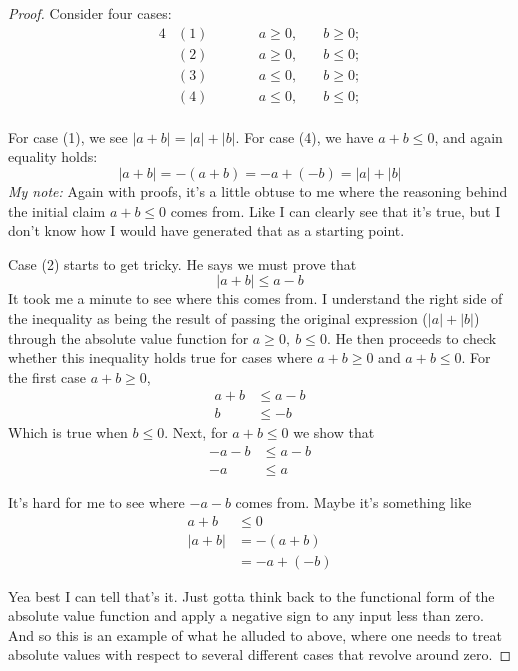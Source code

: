 \begin{proof}
    Consider four cases:
    \begin{alignat*}{4}
        &(1)\quad\quad&& a \geq 0, \quad & b \geq 0;\\
        &(2)\quad\quad && a \geq 0, \quad & b \leq 0;\\
        &(3)\quad\quad && a \leq 0, \quad & b \geq 0;\\
        &(4)\quad\quad && a \leq 0, \quad & b \leq 0;\\
    \end{alignat*} 

    For case (1), we see $\lvert a + b \rvert = \lvert a \rvert + \lvert b \rvert$.
    For case (4), we have $a+b \leq 0$, and again equality holds:
    \[
    \lvert a + b \rvert = -(a+b) = -a + (-b) = \lvert a \rvert + \lvert b \rvert
\]
    \emph{My note:} Again with proofs, it's a little obtuse to me where the reasoning
    behind the initial claim $a+b \leq 0$ comes from. Like I can clearly see that it's
    true, but I don't know how I would have generated that as a starting point.

    Case (2) starts to get tricky. He says we must prove that
    \[
    \lvert a + b \rvert \leq a - b
    \]  
    It took me a minute to see where this comes from. I understand the right side of the
    inequality as being the result of passing the original expression ($\lvert a \rvert +
    \lvert b \rvert$) through the absolute value function for $a \geq 0,~b \leq 0$. He
    then proceeds to check whether this inequality holds true for cases where $a + b \geq 0$
    and $a + b \leq 0$. For the first case $a + b \geq 0$,
    \begin{align*}
        a + b &\leq a - b\\
        b &\leq -b
    \end{align*}
    Which is true when $b \leq 0$. Next, for $a + b \leq 0$ we show that
    \begin{align*}
        -a - b &\leq a - b\\
        -a &\leq a
    \end{align*}

    It's hard for me to see where $-a - b$ comes from. Maybe it's something like
    \begin{align*}
        a + b &\leq 0\\
        \lvert a + b \rvert &= -(a + b)\\
        &= -a + (-b)
    \end{align*}

    Yea best I can tell that's it. Just gotta think back to the functional form of the
    absolute value function and apply a negative sign to any input less than zero. And so
    this is an example of what he alluded to above, where one needs to treat absolute
    values with respect to several different cases that revolve around zero.
        
\end{proof}

